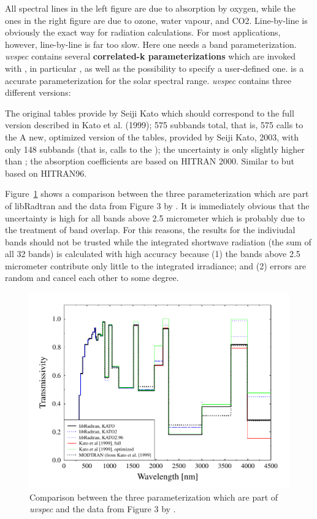 All spectral lines in the left figure are due to absorption by oxygen,
while the ones in the right figure are due to ozone, water vapour, and
CO2. Line-by-line is obviously the exact way for radiation
calculations. For most applications, however, line-by-line is far too
slow. Here one needs a band parameterization.
{\sl uvspec} contains several {\bf correlated-k
parameterizations} which are invoked with , in
particular \citet{Kato1999b, fu92, Kratz1995}, as
well as the possibility to specify a user-defined
one. \citet{Kato1999b}
is a accurate parameterization for the solar spectral
range. {\sl uvspec} contains three different versions:
\begin{description}
The original tables provide by Seiji
Kato which should correspond to the full version described in Kato et
al. (1999); 575 subbands total, that is, 575 calls to the
A new, optimized version of the
tables, provided by Seiji Kato, 2003, with only 148 subbands (that is,
calls to the ); the uncertainty is only slightly
higher than ; the absorption coefficients are based on
HITRAN 2000.
Similar to  but based on HITRAN96.
\end{description}

Figure~\ref{fig:figure3} shows a comparison between the
three parameterization which are part of libRadtran and the data from
Figure 3 by \citet{Kato1999b}. It is immediately obvious that the
uncertainty is high for all bands above 2.5 micrometer which is
probably due to the treatment of band overlap. For this reasons, the
results for the indiviudal bands should not be trusted while the
integrated shortwave radiation (the sum of all 32 bands) is calculated
with high accuracy because (1) the bands above 2.5 micrometer
contribute only little to the integrated irradiance; and (2) errors
are random and cancel each other to some degree.

\begin{figure}[t]
  \centering
  \includegraphics[width=1.0\hsize]{./figs/figure3.pdf}
  \caption{Comparison between the three parameterization which are
    part of {\sl uvspec} and the data from Figure 3 by \citet{Kato1999b}.}
  \label{fig:figure3}
\end{figure}

